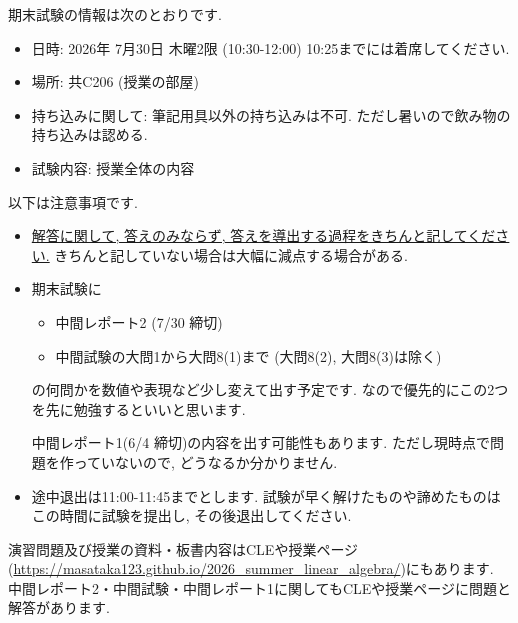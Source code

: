 \documentclass[dvipdfmx,a4paper,11pt]{article} %
\theoremstyle{definition}
\begin{document}
期末試験の情報は次のとおりです. 
\begin{itemize}
  \setlength{\parskip}{0cm} 
  \setlength{\itemsep}{0cm}
\item 日時: 2026年 7月30日 木曜2限 (10:30-12:00) 10:25までには着席してください.
\item 場所: 共C206 (授業の部屋)
\item 持ち込みに関して: 筆記用具以外の持ち込みは不可. 
ただし暑いので飲み物の持ち込みは認める. 
\item 試験内容: 授業全体の内容
\end{itemize}
以下は注意事項です.
\begin{itemize}
  \setlength{\parskip}{0cm} 
 \setlength{\itemsep}{0cm}
 \item \underline{解答に関して, 答えのみならず, 答えを導出する過程をきちんと記してください.} きちんと記していない場合は大幅に減点する場合がある.
 \item 
期末試験に
\begin{itemize}
\item 中間レポート2 (7/30 締切)
\item 中間試験の大問1から大問8(1)まで (大問8(2), 大問8(3)は除く)
\end{itemize}
の何問かを数値や表現など少し変えて出す予定です. なので優先的にこの2つを先に勉強するといいと思います. 

中間レポート1(6/4 締切)の内容を出す可能性もあります. ただし現時点で問題を作っていないので, どうなるか分かりません.
\item 途中退出は11:00-11:45までとします. 試験が早く解けたものや諦めたものはこの時間に試験を提出し, その後退出してください. 
\end{itemize}

演習問題及び授業の資料・板書内容はCLEや授業ページ(\url{https://masataka123.github.io/2026_summer_linear_algebra/})にもあります. 
中間レポート2・中間試験・中間レポート1に関してもCLEや授業ページに問題と解答があります. 
\end{document}
